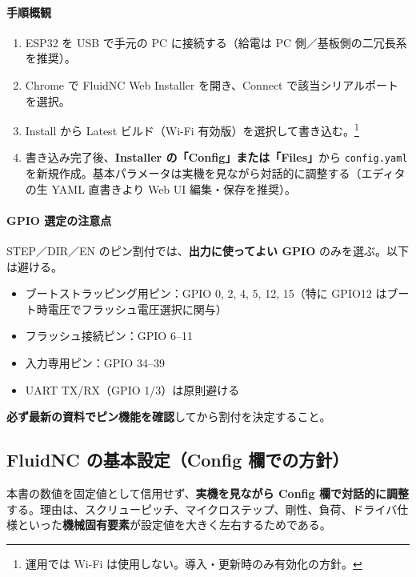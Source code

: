 \documentclass[uplatex,dvipdfmx]{ujarticle}
\begin{document}
\paragraph{手順概観}
\begin{enumerate}
  \item ESP32 を USB で手元の PC に接続する（給電は PC 側／基板側の二冗長系を推奨）。
  \item Chrome で FluidNC Web Installer を開き、Connect で該当シリアルポートを選択。
  \item Install から Latest ビルド（Wi-Fi 有効版）を選択して書き込む。\footnote{運用では Wi-Fi は使用しない。導入・更新時のみ有効化の方針。}
  \item 書き込み完了後、\textbf{Installer の「Config」または「Files」}から \texttt{config.yaml} を新規作成。基本パラメータは実機を見ながら対話的に調整する（エディタの生 YAML 直書きより Web UI 編集・保存を推奨）。
\end{enumerate}

\paragraph{GPIO 選定の注意点}
STEP／DIR／EN のピン割付では、\textbf{出力に使ってよい GPIO} のみを選ぶ。以下は避ける\cite{espressif-gpio,espressif-datasheet}。
\begin{itemize}
  \item ブートストラッピング用ピン：GPIO 0, 2, 4, 5, 12, 15（特に GPIO12 はブート時電圧でフラッシュ電圧選択に関与）
  \item フラッシュ接続ピン：GPIO 6--11
  \item 入力専用ピン：GPIO 34--39
  \item UART TX/RX（GPIO 1/3）は原則避ける
\end{itemize}
\textbf{必ず最新の資料でピン機能を確認}してから割付を決定すること。

\subsection{FluidNC の基本設定（Config 欄での方針）}

本書の数値を固定値として信用せず、\textbf{実機を見ながら Config 欄で対話的に調整}する\cite{fluidnc-motion}。理由は、スクリューピッチ、マイクロステップ、剛性、負荷、ドライバ仕様といった\textbf{機械固有要素}が設定値を大きく左右するためである。
\end{document}
